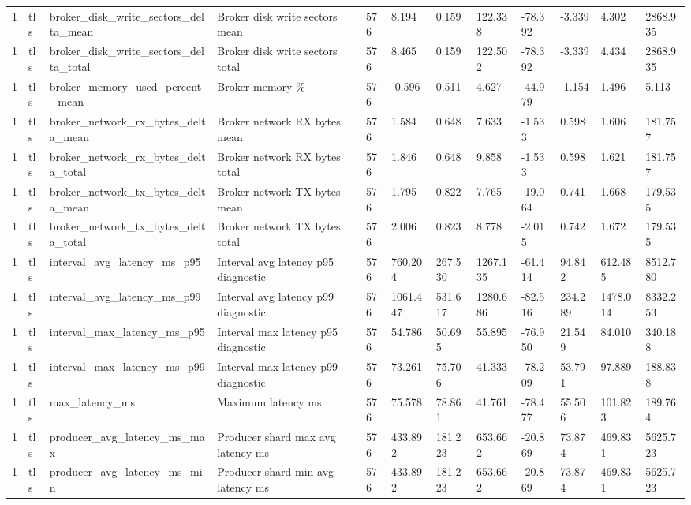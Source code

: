 \begin{longtable}{llllllllllll}
1 & tls & broker\_disk\_write\_sectors\_delta\_mean & Broker disk write sectors mean & 576 & 8.194 & 0.159 & 122.338 & -78.392 & -3.339 & 4.302 & 2868.935 \\
1 & tls & broker\_disk\_write\_sectors\_delta\_total & Broker disk write sectors total & 576 & 8.465 & 0.159 & 122.502 & -78.392 & -3.339 & 4.434 & 2868.935 \\
1 & tls & broker\_memory\_used\_percent\_mean & Broker memory \% & 576 & -0.596 & 0.511 & 4.627 & -44.979 & -1.154 & 1.496 & 5.113 \\
1 & tls & broker\_network\_rx\_bytes\_delta\_mean & Broker network RX bytes mean & 576 & 1.584 & 0.648 & 7.633 & -1.533 & 0.598 & 1.606 & 181.757 \\
1 & tls & broker\_network\_rx\_bytes\_delta\_total & Broker network RX bytes total & 576 & 1.846 & 0.648 & 9.858 & -1.533 & 0.598 & 1.621 & 181.757 \\
1 & tls & broker\_network\_tx\_bytes\_delta\_mean & Broker network TX bytes mean & 576 & 1.795 & 0.822 & 7.765 & -19.064 & 0.741 & 1.668 & 179.535 \\
1 & tls & broker\_network\_tx\_bytes\_delta\_total & Broker network TX bytes total & 576 & 2.006 & 0.823 & 8.778 & -2.015 & 0.742 & 1.672 & 179.535 \\
1 & tls & interval\_avg\_latency\_ms\_p95 & Interval avg latency p95 diagnostic & 576 & 760.204 & 267.530 & 1267.135 & -61.414 & 94.842 & 612.485 & 8512.780 \\
1 & tls & interval\_avg\_latency\_ms\_p99 & Interval avg latency p99 diagnostic & 576 & 1061.447 & 531.617 & 1280.686 & -82.516 & 234.289 & 1478.014 & 8332.253 \\
1 & tls & interval\_max\_latency\_ms\_p95 & Interval max latency p95 diagnostic & 576 & 54.786 & 50.695 & 55.895 & -76.950 & 21.549 & 84.010 & 340.188 \\
1 & tls & interval\_max\_latency\_ms\_p99 & Interval max latency p99 diagnostic & 576 & 73.261 & 75.706 & 41.333 & -78.209 & 53.791 & 97.889 & 188.838 \\
1 & tls & max\_latency\_ms & Maximum latency ms & 576 & 75.578 & 78.861 & 41.761 & -78.477 & 55.506 & 101.823 & 189.764 \\
1 & tls & producer\_avg\_latency\_ms\_max & Producer shard max avg latency ms & 576 & 433.892 & 181.223 & 653.662 & -20.869 & 73.874 & 469.831 & 5625.723 \\
1 & tls & producer\_avg\_latency\_ms\_min & Producer shard min avg latency ms & 576 & 433.892 & 181.223 & 653.662 & -20.869 & 73.874 & 469.831 & 5625.723 \\

\end{longtable}
